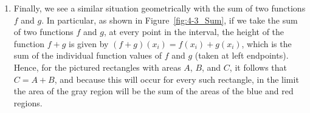 \begin{enumerate}[1)]
\item Finally, we see a similar situation geometrically with the sum of two functions $f$ and $g$. In particular, as shown in Figure~\ref{fig:4-3_Sum}, if we take the sum of two functions $f$ and $g$, at every point in the interval, the height of the function $f+g$ is given by $(f+g)(x_i) = f(x_i) + g(x_i)$, which is the sum of the individual function values of $f$ and $g$ (taken at left endpoints).  Hence, for the pictured rectangles with areas $A$, $B$, and $C$, it follows that $C = A + B$, and because this will occur for every such rectangle, in the limit the area of the gray region will be the sum of the areas of the blue and red regions.  

\begin{figure} %
\begin{flushright}
\captionsetup[subfigure]{labelformat=empty}
\hspace{.25cm}

\end{flushright}
\end{figure}
\end{enumerate}
